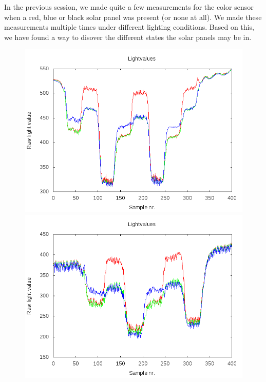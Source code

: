 In the previous session, we made quite a few measurements for the color
sensor when a red, blue or black solar panel was present (or none at
all). We made these measurements multiple times under different lighting
conditions. Based on this, we have found a way to disover the different
states the solar panels may be in.
\begin{figure}[hbt]
  \centering
  \includegraphics[scale=0.35]{../experiments/2prototype/results/gnuplot/Colormesrun1.png}
  \includegraphics[scale=0.35]{../experiments/2prototype/results/gnuplot/Colormesrun2.png}

\end{figure}
